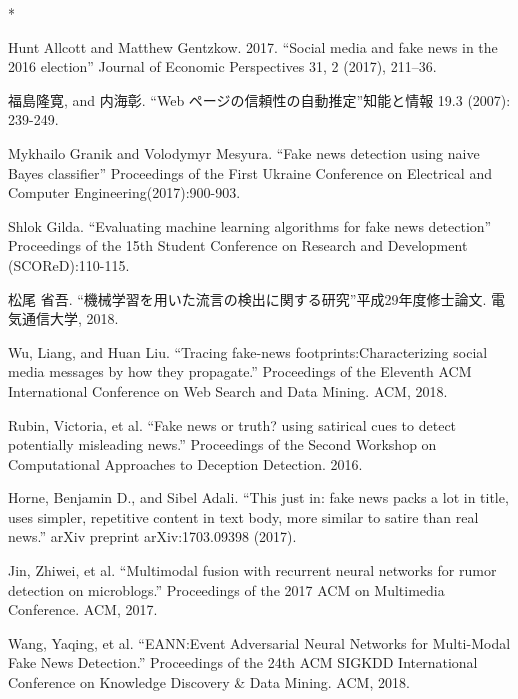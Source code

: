 \documentclass[a4paper,12pt,oneside,openany,uplatex]{jsbook}
\begin{document}


\newpage
% 
% 
%
%

\begin{thebibliography} {*}

 Hunt Allcott and Matthew Gentzkow. 2017.\@
``Social media and fake news in the 2016 election''
Journal of Economic Perspectives 31, 2 (2017), 211–36.

 福島隆寛, and 内海彰.\@
``Web ページの信頼性の自動推定''\@ 知能と情報 19.3 (2007): 239-249.

 Mykhailo Granik and Volodymyr Mesyura. \@
``Fake news detection using naive Bayes classifier''
Proceedings of the First Ukraine Conference on Electrical and Computer Engineering(2017):900-903.

 Shlok Gilda.
``Evaluating machine learning algorithms for fake news detection''
Proceedings of the 15th Student Conference on Research and Development (SCOReD):110-115.

 松尾 省吾.\@
``機械学習を用いた流言の検出に関する研究''\@ 平成29年度修士論文. 電気通信大学, 2018.

 Wu, Liang, and Huan Liu.\@
``Tracing fake-news footprints:\@ Characterizing social media messages by how they propagate.''
Proceedings of the Eleventh ACM International Conference on Web Search and Data Mining. ACM, 2018.

 Rubin, Victoria, et al.\@
``Fake news or truth? using satirical cues to detect potentially misleading news.''
Proceedings of the Second Workshop on Computational Approaches to Deception Detection. 2016.

 Horne, Benjamin D., and Sibel Adali.\@
``This just in: fake news packs a lot in title, uses simpler, repetitive content in text body, more similar to satire than real news.''
arXiv preprint arXiv:1703.09398 (2017).

 Jin, Zhiwei, et al.\@
``Multimodal fusion with recurrent neural networks for rumor detection on microblogs.''
Proceedings of the 2017 ACM on Multimedia Conference. ACM, 2017.

 Wang, Yaqing, et al.\@
``EANN:\@ Event Adversarial Neural Networks for Multi-Modal Fake News Detection.''
Proceedings of the 24th ACM SIGKDD International Conference on Knowledge Discovery \& Data Mining. ACM, 2018.
\end{thebibliography}

%

%
%
\end{document}
